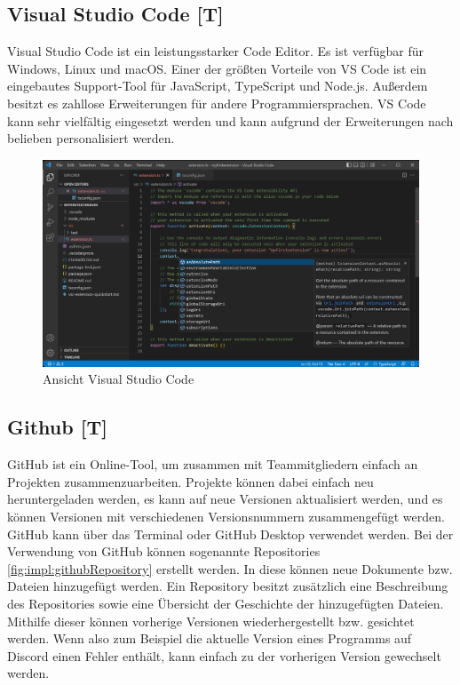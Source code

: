 \subsection{Visual Studio Code [T]} 

Visual Studio Code ist ein leistungsstarker Code Editor. Es ist verfügbar für Windows, Linux und macOS. 
Einer der größten Vorteile von VS Code ist ein eingebautes Support-Tool für JavaScript, TypeScript und Node.js. Außerdem besitzt es zahllose Erweiterungen für andere Programmiersprachen. VS Code kann sehr vielfältig eingesetzt werden und kann aufgrund der Erweiterungen nach belieben personalisiert werden. \cite{VSCodeOfficialSite}

\begin{figure}[h t]
  \centering
  \includegraphics[scale=0.4]{pics/visualStudioCode.png}
  \caption{Ansicht Visual Studio Code}
  \label{fig:impl:vsCode}
\end{figure}

\subsection{Github [T]} 
GitHub ist ein Online-Tool, um zusammen mit Teammitgliedern einfach an Projekten zusammenzuarbeiten. Projekte können dabei einfach neu heruntergeladen werden, es kann auf neue Versionen aktualisiert werden, und es können Versionen mit verschiedenen Versionsnummern zusammengefügt werden. GitHub kann über das Terminal oder GitHub Desktop verwendet werden. \cite{GitHubOfficialSite}
Bei der Verwendung von GitHub können sogenannte Repositories \ref{fig:impl:githubRepository} erstellt werden. In diese können neue Dokumente bzw. Dateien hinzugefügt werden. Ein Repository besitzt zusätzlich eine Beschreibung des Repositories sowie eine Übersicht der Geschichte der hinzugefügten Dateien. Mithilfe dieser können vorherige Versionen wiederhergestellt bzw. gesichtet werden. Wenn also zum Beispiel die aktuelle Version eines Programms auf Discord einen Fehler enthält, kann einfach zu der vorherigen Version gewechselt werden.

